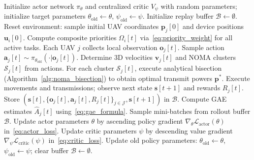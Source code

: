 \documentclass[journal]{IEEEtran}
\begin{document}
\begin{algorithm}[!t]
\caption{CTDE-Based PA-MUJO Training and Execution Procedure}
\label{alg:pamujo_training}
\begin{algorithmic}[1]
\State Initialize actor network $\pi_\theta$ and centralized critic $V_\psi$ with random parameters; initialize target parameters $\theta_{\mathrm{old}} \gets \theta$, $\psi_{\mathrm{old}} \gets \psi$.
\State Initialize replay buffer $\mathcal{B} \gets \emptyset$.
    \State Reset environment: sample initial UAV coordinates $\mathbf{p}_j[0]$ and device positions $\mathbf{u}_i[0]$.
        \State Compute composite priorities $\Omega_i[t]$ via~\eqref{eq:priority_weight} for all active tasks.
        \State Each UAV $j$ collects local observation $\mathbf{o}_j[t]$.
        \State Sample action $\mathbf{a}_j[t] \sim \pi_{\theta_{\mathrm{old}}}(\cdot | \mathbf{o}_j[t])$.
        \State Determine 3D velocities $\mathbf{v}_j[t]$ and NOMA clusters $\mathcal{S}_j[t]$ from actions.
        \State For each cluster $\mathcal{S}_j[t]$, execute analytical bisection (Algorithm~\ref{alg:noma_bisection}) to obtain optimal transmit powers $\mathbf{p}^*$.
        \State Execute movements and transmissions; observe next state $\mathbf{s}[t+1]$ and rewards $R_j[t]$.
        \State Store $(\mathbf{s}[t], \{\mathbf{o}_j[t], \mathbf{a}_j[t], R_j[t]\}_{j \in \mathcal{J}}, \mathbf{s}[t+1])$ in $\mathcal{B}$.
    \EndFor
    \State Compute GAE estimates $\hat{A}_j[t]$ using~\eqref{eq:gae_formula}.
        \State Sample mini-batches from rollout buffer $\mathcal{B}$.
        \State Update actor parameters $\theta$ by ascending policy gradient $\nabla_\theta \mathcal{L}_{\mathrm{actor}}(\theta)$ in~\eqref{eq:actor_loss}.
        \State Update critic parameters $\psi$ by descending value gradient $\nabla_\psi \mathcal{L}_{\mathrm{critic}}(\psi)$ in~\eqref{eq:critic_loss}.
    \EndFor
    \State Update old policy parameters: $\theta_{\mathrm{old}} \gets \theta$, $\psi_{\mathrm{old}} \gets \psi$; clear buffer $\mathcal{B} \gets \emptyset$.
\EndFor
\end{algorithmic}
\end{algorithm}
\end{document}
